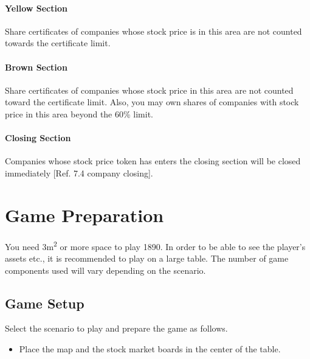 \documentclass{article}
\begin{document}
\begin{CJK}{UTF8}{min}
\paragraph{Yellow Section}
Share certificates of companies whose stock price is in this area
are not counted towards the certificate limit.



\paragraph{Brown Section}
Share certificates of companies whose stock price in this area
are not counted toward the certificate limit. Also, you
may own shares of companies with stock price in this area beyond the
60\% limit.



\paragraph{Closing Section}
Companies whose stock price token has enters the closing
section will be closed immediately [Ref. 7.4 company closing].


\section{Game Preparation}

You need 3m\textsuperscript{2} or more space to play 1890. In order to
be able to see the player's assets etc., it is recommended to play on
a large table. The number of game components used will vary depending
on the scenario.



\subsection{Game Setup}
Select the scenario to play and prepare the game as follows.
\begin{itemize}
\item Place the map and the stock market boards in the center of the table.


\end{itemize}
\end{CJK}
\end{document}
